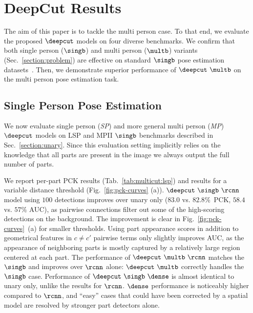 \section{DeepCut Results}
\label{sec:experiments:multicut}
The aim of this paper is to tackle the multi person case. To that end,
we evaluate the proposed $\deepcut$ models on four diverse
benchmarks. We confirm that both single person ($\singb$) and
multi person ($\multb$) variants (Sec.~\ref{section:problem}) are
effective on standard $\singb$ pose estimation
datasets~\cite{johnson10bmvc,andriluka14cvpr}.
Then, we demonstrate superior performance of $\deepcut~\multb$ on the
multi person pose estimation task.



\subsection{Single Person Pose Estimation}
\label{sec:multicut:single}
We now evaluate single person (\textit{SP}) and more general
multi person (\textit{MP}) $\deepcut$ models on LSP and MPII $\singb$
benchmarks described in Sec.~\ref{section:unary}. Since this
evaluation setting implicitly relies on the knowledge that all parts
are present in the image we always output the full number of parts.


 We report per-part PCK results
(Tab.~\ref{tab:multicut:lsp}) and results for a variable distance
threshold (Fig.~\ref{fig:pck-curves} (a)). $\deepcut~\singb~\rcnn$
model using $100$ detections improves over unary only ($83.0$
vs. $82.8$\%~PCK, $58.4$ vs. $57$\% AUC), as pairwise connections
filter out some of the high-scoring detections on the background. The
improvement is clear in Fig.~\ref{fig:pck-curves}~(a) for smaller
thresholds. Using part appearance scores in addition to geometrical
features in $c\neq c'$ pairwise terms only slightly improves AUC, as
the appearance of neighboring parts is mostly captured by a relatively
large region centered at each part. 
The performance of $\deepcut~\multb~\rcnn$ matches the
$\singb$ and improves over $\rcnn$ alone: $\deepcut~\multb$ correctly
handles the $\singb$ case. Performance of $\deepcut~\singb~\dense$ is
almost identical to unary only, unlike the results for
$\rcnn$. $\dense$ performance is noticeably higher compared to
$\rcnn$, and ``easy'' cases that could have been corrected by a
spatial model are resolved by stronger part detectors alone.

